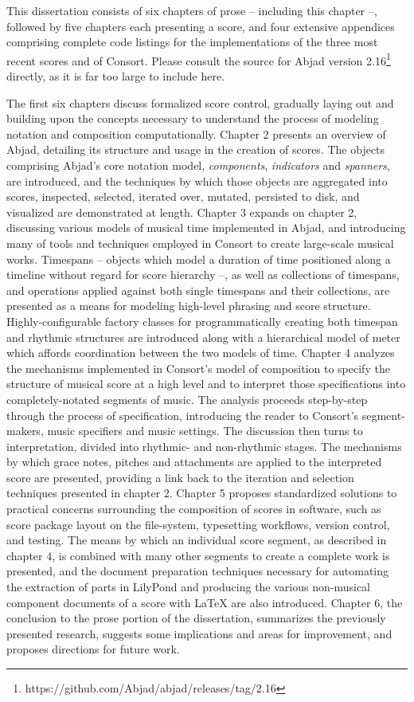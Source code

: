 This dissertation consists of six chapters of prose -- including this chapter
--, followed by five chapters each presenting a score, and four extensive
appendices comprising complete code listings for the implementations of the
three most recent scores and of Consort. Please consult the source for Abjad
version 2.16\footnote{https://github.com/Abjad/abjad/releases/tag/2.16}
directly, as it is far too large to include here.

The first six chapters discuss formalized score control, gradually laying out
and building upon the concepts necessary to understand the process of modeling
notation and composition computationally. Chapter 2 presents an overview of
Abjad, detailing its structure and usage in the creation of scores. The objects
comprising Abjad's core notation model, \emph{components}, \emph{indicators}
and \emph{spanners}, are introduced, and the techniques by which those objects
are aggregated into scores, inspected, selected, iterated over, mutated,
persisted to disk, and visualized are demonstrated at length. Chapter 3 expands
on chapter 2, discussing various models of musical time implemented in Abjad,
and introducing many of tools and techniques employed in Consort to create
large-scale musical works. Timespans -- objects which model a duration of time
positioned along a timeline without regard for score hierarchy --, as well as
collections of timespans, and operations applied against both single timespans
and their collections, are presented as a means for modeling high-level
phrasing and score structure. Highly-configurable factory classes for
programmatically creating both timespan and rhythmic structures are introduced
along with a hierarchical model of meter which affords coordination between the
two models of time. Chapter 4 analyzes the mechanisms implemented in Consort's
model of composition to specify the structure of musical score at a high level
and to interpret those specifications into completely-notated segments of
music. The analysis proceeds step-by-step through the process of specification,
introducing the reader to Consort's segment-makers, music specifiers and music
settings. The discussion then turns to interpretation, divided into rhythmic-
and non-rhythmic stages. The mechanisms by which grace notes, pitches and
attachments are applied to the interpreted score are presented, providing a
link back to the iteration and selection techniques presented in chapter 2.
Chapter 5 proposes standardized solutions to practical concerns surrounding the
composition of scores in software, such as score package layout on the
file-system, typesetting workflows, version control, and testing. The means by
which an individual score segment, as described in chapter 4, is combined with
many other segments to create a complete work is presented, and the document
preparation techniques necessary for automating the extraction of parts in
LilyPond and producing the various non-musical component documents of a score
with \LaTeX{} are also introduced. Chapter 6, the conclusion to the prose
portion of the dissertation, summarizes the previously presented research,
suggests some implications and areas for improvement, and proposes directions
for future work.

